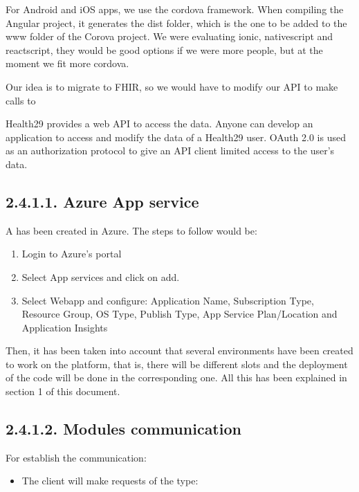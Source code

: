\documentclass[letterpaper,10pt,english]{sphinxmanual}
\begin{document}
For Android and iOS apps, we use the cordova framework. When compiling the Angular project, it generates the dist folder, which is the one to be added to the www folder of the Corova project.  We were evaluating ionic, nativescript and reactscript, they would be good options if we were more people, but at the moment we fit more cordova.

Our idea is to migrate to FHIR, so we would have to modify our API to make calls to 

Health29 provides a web API to access the data. Anyone can develop an application to access and modify the data of a Health29 user. OAuth 2.0 is used as an authorization protocol to give an API client limited access to the user’s data.


\subsection{2.4.1.1. Azure App service}
\label{\detokenize{pages/SW/Code:azure-app-service}}
A  has been created in Azure. The steps to follow would be:
\begin{enumerate}
%
\item {} 
Login to Azure’s portal

\item {} 
Select App services and click on add.

\item {} 
Select Webapp and configure: Application Name, Subscription Type, Resource Group, OS Type, Publish Type, App Service Plan/Location and Application Insights

\end{enumerate}

Then, it has been taken into account that several environments have been created to work on the platform, that is, there will be different slots and the deployment of the code will be done in the corresponding one. All this has been explained in section 1 of this document.


\subsection{2.4.1.2. Modules communication}
\label{\detokenize{pages/SW/Code:modules-communication}}
For establish the communication:
\begin{itemize}
\item {} 
The client will make requests of the type:

\end{itemize}
\end{document}
